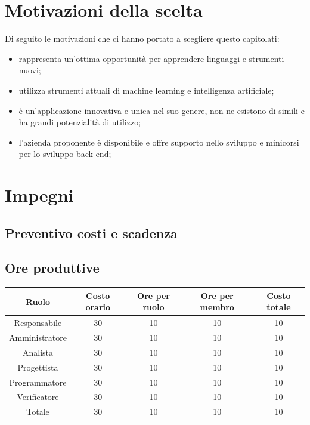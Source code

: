 \documentclass[12pt,a4paper]{article}
\begin{document}
\section{Motivazioni della scelta}
Di seguito le motivazioni che ci hanno portato a scegliere questo capitolati:
	\begin{itemize}
		\item rappresenta un'ottima opportunità per apprendere linguaggi e strumenti nuovi;
		\item utilizza strumenti attuali di machine learning e intelligenza artificiale;
		\item è un'applicazione innovativa e unica nel suo genere, non ne esistono di simili e ha grandi potenzialità di utilizzo;
		\item l'azienda proponente è disponibile e offre supporto nello sviluppo e minicorsi per lo sviluppo back-end;
	\end{itemize}
\section{Impegni}
	\subsection{Preventivo costi e scadenza}

	\subsection{Ore produttive}
		\begin{center}
			\begin{tabular}{||c | c | c | c | c||} 
			 \hline
			 Ruolo & Costo orario  & Ore per ruolo & Ore per membro & Costo totale \\ [0.5ex] 
			 \hline\hline
			 Responsabile & 30 & 10 & 10 & 10 \\ 
			 \hline
			 Amministratore & 30 & 10 & 10 & 10 \\
			 \hline
			 Analista & 30 & 10 & 10 & 10 \\
			 \hline
			 Progettista & 30 & 10 & 10 & 10 \\
			 \hline
			 Programmatore & 30 & 10 & 10 & 10 \\
			 \hline
			 Verificatore & 30 & 10 & 10 & 10 \\
			 \hline\hline
			 Totale & 30 & 10 & 10 & 10 \\
			 \hline
			\end{tabular}
		\end{center}
\end{document}
